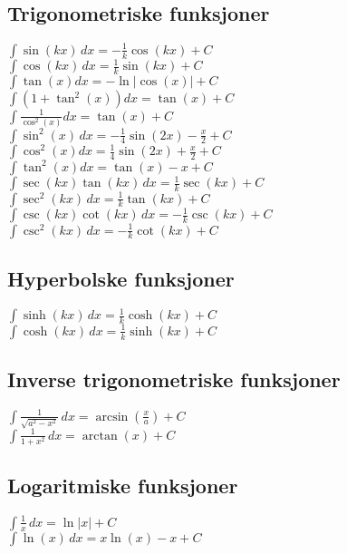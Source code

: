 \documentclass[a4paper,7pt,fleqn]{article}
\begin{document}
\begin{multicols}{2}
\begin{minipage}{\linewidth}
\subsection*{Trigonometriske funksjoner}
\(\int \sin(kx) \, dx = -\frac{1}{k} \cos(kx) + C\) \\
\(\int \cos(kx) \, dx = \frac{1}{k} \sin(kx) + C\) \\
\(\int \tan(x) dx = -\ln|\cos(x)| + C\) \\
\(\int (1+\tan^2(x)) dx = \tan(x) + C\) \\
\(\int \frac{1}{\cos^2(x)} dx = \tan(x) + C\) \\
\(\int \sin^2(x) \, dx = -\frac{1}{4} \sin(2x) - \frac{x}{2} + C\) \\
\(\int \cos^2(x) dx = \frac{1}{4} \sin(2x) + \frac{x}{2} + C\) \\
\(\int \tan^2(x) dx = \tan(x) - x + C\) \\
\(\int \sec(kx) \tan(kx) \, dx = \frac{1}{k} \sec(kx) + C\) \\
\(\int \sec^2(kx) \, dx = \frac{1}{k} \tan(kx) + C\) \\
\(\int \csc(kx) \cot(kx) \, dx = -\frac{1}{k} \csc(kx) + C\) \\
\(\int \csc^2(kx) \, dx = -\frac{1}{k} \cot(kx) + C\) \\


\subsection*{Hyperbolske funksjoner}
\(\int \sinh(kx) \, dx = \frac{1}{k} \cosh(kx) + C\) \\
\(\int \cosh(kx) \, dx = \frac{1}{k} \sinh(kx) + C\) \\
\end{minipage}

\begin{minipage}{\linewidth}
\subsection*{Inverse trigonometriske funksjoner}
\(\int \frac{1}{\sqrt{a^2 - x^2}} \, dx = \arcsin\left(\frac{x}{a}\right) + C\) \\
\(\int \frac{1}{1 + x^2} \, dx = \arctan(x) + C\) \\

\subsection*{Logaritmiske funksjoner}
\(\int \frac{1}{x} \, dx = \ln|x| + C\) \\
\(\int \ln(x) \, dx = x\ln(x) - x + C\) \\


\end{minipage}
\end{multicols}
\end{document}
